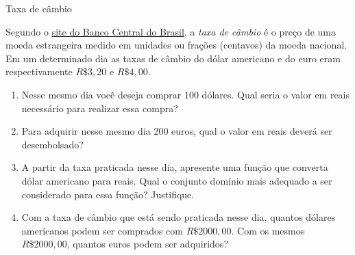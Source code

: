 \begin{task}{Taxa de câmbio}
\label{ativ-cambio}



Segundo o \href{http://www.bcb.gov.br/pre/bc\_atende/port/taxCam.asp}{site do Banco Central do Brasil}, a \emph{taxa de câmbio} é o preço de uma moeda estrangeira medido em unidades ou frações (centavos) da moeda nacional. Em um determinado dia as taxas de câmbio do dólar americano e do euro eram respectivamente \(R\$ 3,20\) e \(R\$ 4,00\).
\begin{enumerate}
\item {} 
Nesse mesmo dia você deseja comprar \(100\) dólares. Qual seria o valor em reais necessário para realizar essa compra?

\item {} 
Para adquirir nesse mesmo dia \(200\) euros, qual o valor em reais deverá ser desembolsado?

\item {} 
A partir da taxa praticada nesse dia, apresente uma função que converta dólar americano para reais. Qual o conjunto domínio mais adequado a ser considerado para essa função? Justifique.

\item {} 
Com a taxa de câmbio que está sendo praticada nesse dia, quantos dólares americanos podem ser comprados com \(R\$ 2000,00\). Com os mesmos \(R\$ 2000,00\), quantos euros podem ser adquiridos?

\end{enumerate}
\end{task}



